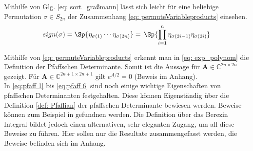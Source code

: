 \noindent Mithilfe von Glg. \eqref{eq: sort_graßmann} lässt sich leicht für eine beliebige Permutation $\sigma \in S_{2n}$ der Zusammenhang \eqref{eq: permuteVariableproducts} einsehen.
\begin{align} \label{eq: permuteVariableproducts}
sign(\sigma) = \Sp{\eta_{\sigma(1)} \cdots \eta_{\sigma(2n)}}  = \,\Sp{ \prod_{i=1}^n \eta_{\sigma(2i-1)}\eta_{\sigma(2i)} }
\end{align}

\noindent Mithilfe von \eqref{eq: permuteVariableproducts} erkennt man in \eqref{eq: exp_polynom} die Definition der Pfaffschen Determinante. Somit ist die Aussage für $\bm{A} \in\mathbb{C}^{2n \times 2n}$ gezeigt. Für $\bm{A} \in\mathbb{C}^{2n+1 \times 2n+1}$ gilt $e^{A/2} = 0$ (Beweis im Anhang).\\

\noindent In \eqref{eq:pfaff 1} bis \eqref{eq:pfaff 6} sind noch einige wichtige Eigenschaften von pfaffschen Determinanten festgehalten. Diese können Eigenständig über die Definition \eqref{def: Pfaffian} der pfaffschen Determinante bewiesen werden. Beweise können zum Beispiel in \cite{} gefundnen werden. Die Definition über das Berezin Integral bildet jedoch einen alternativen, sehr eleganten Zugang, um all diese Beweise zu führen. Hier sollen nur die Resultate zusammengefasst werden, die Beweise befinden sich im Anhang.

